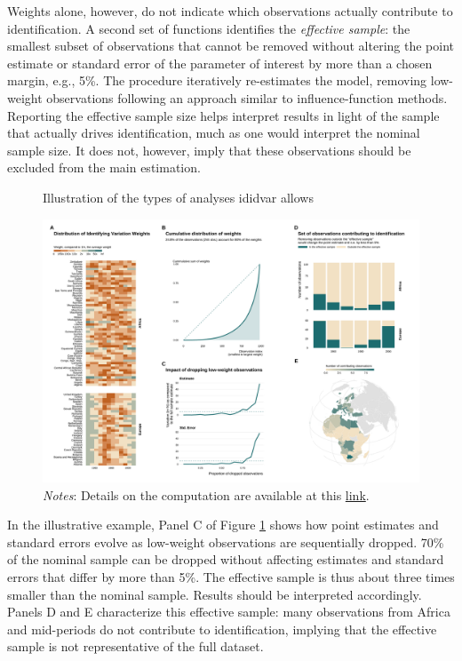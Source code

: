 \documentclass[usletter, 12pt]{article}
\begin{document}
				Weights alone, however, do not indicate which observations actually contribute to identification. A second set of functions identifies the \textit{effective sample}: the smallest subset of observations that cannot be removed without altering the point estimate or standard error of the parameter of interest by more than a chosen margin, e.g., 5\%.  The procedure iteratively re-estimates the model, removing low-weight observations following an approach similar to influence-function methods. Reporting the effective sample size helps interpret results in light of the sample that actually drives identification, much as one would interpret the nominal sample size. It does not, however, imply that these observations should be excluded from the main estimation.
				
				\begin{landscape}
				\begin{figure}[ht]
					\caption{Illustration of the types of analyses ididvar allows}
					\label{graph_ididvar}
					\includegraphics[height=0.9\textheight]{images/ididvar.pdf}
					\caption*{\footnotesize \textit{Notes}: Details on the computation are available at this \href{https://vincentbagilet.github.io/causal_exaggeration/ididvar.html}{link}.}
				\end{figure}
				\end{landscape}
				
				In the illustrative example, Panel C of Figure \ref{graph_ididvar} shows how point estimates and standard errors evolve as low-weight observations are sequentially dropped. 70\% of the nominal sample can be dropped without affecting estimates and standard errors that differ by more than 5\%. The effective sample is thus about three times smaller than the nominal sample.  Results should be interpreted accordingly. Panels D and E characterize this effective sample: many observations from Africa and mid-periods do not contribute to identification, implying that the effective sample is not representative of the full dataset.
				
\end{document}
